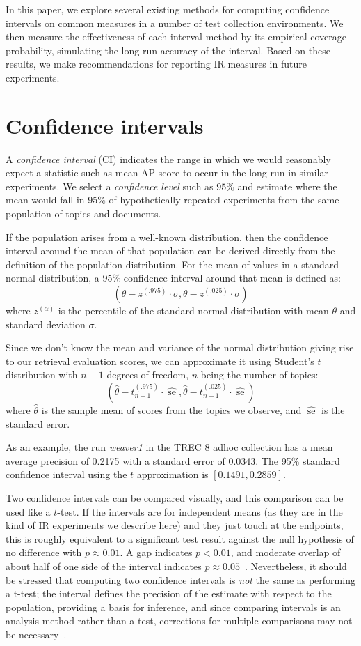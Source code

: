 \documentclass{sig-alt-release-2013}
\DeclareMathOperator{\se}{se}
\begin{document}
In this paper, we explore several existing methods for computing confidence intervals on common measures in a number of test collection environments.  We then measure the effectiveness of each interval method by its empirical coverage probability, simulating the long-run accuracy of the interval.  Based on these results, we make recommendations for reporting IR measures in future experiments.

\section{Confidence intervals}

A {\em confidence interval} (CI) indicates the range in which we would reasonably expect a statistic such as mean AP score to occur in the long run in similar experiments.  We select a {\em confidence level} such as $95\%$ and estimate where the mean would fall in 95\% of hypothetically repeated experiments from the same population of topics and documents.

If the population arises from a well-known distribution, then the confidence interval around the mean of that population can be derived directly from the definition of the population distribution.  For the mean of values in a standard normal distribution, a 95\% confidence interval around that mean is defined as:
\[ (\theta - z^{(.975)} \cdot \sigma, \theta - z^{(.025)} \cdot \sigma) \]
where $z^{(\alpha)}$ is the percentile of the standard normal distribution with mean $\theta$ and standard deviation $\sigma$.

Since we don't know the mean and variance of the normal distribution giving rise to our retrieval evaluation scores, we can approximate it using Student's $t$ distribution with $n-1$ degrees of freedom, $n$ being the number of topics:
\[ (\hat{\theta} - t^{(.975)}_{n-1} \cdot \hat{\se}, \hat{\theta} - t^{(.025)}_{n-1} \cdot \hat{\se}) \]
where $\hat{\theta}$ is the sample mean of scores from the topics we observe, and $\hat{\se}$ is the standard error.

As an example, the run {\em weaver1} in the TREC 8 adhoc collection has a  mean average precision of 0.2175 with a standard error of 0.0343.  The 95\% standard confidence interval using the $t$ approximation is $[0.1491, 0.2859]$.

Two confidence intervals can be compared visually, and this comparison can be used like a $t$-test.  If the intervals are for independent means (as they are in the kind of IR experiments we describe here) and they just touch at the endpoints, this is roughly equivalent to a significant test result against the null hypothesis of no difference with $p \approx 0.01$.  A gap indicates $p < 0.01$, and moderate overlap of about half of one side of the interval indicates $p \approx 0.05$~\cite{Cumming12}.  Nevertheless, it should be stressed that computing two confidence intervals is {\em not} the same as performing a t-test; the interval defines the precision of the estimate with respect to the population, providing a basis for inference, and since comparing intervals is an analysis method rather than a test, corrections for multiple comparisons may not be necessary~\cite{Saville90}.
\end{document}
